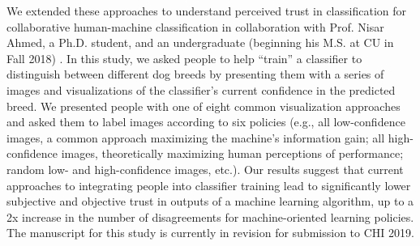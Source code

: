 \documentclass[11pt]{article}
\begin{document}
We extended these approaches to understand perceived trust in classification for collaborative human-machine classification in collaboration with Prof. Nisar Ahmed, a Ph.D. student, and an undergraduate (beginning his M.S. at CU in Fall 2018) \cite{iuzzolino2019In}. In this study, we asked people to help ``train'' a classifier to distinguish between different dog breeds by presenting them with a series of images and visualizations of the classifier's current confidence in the predicted breed. We presented people with one of eight common visualization approaches and asked them to label images according to six policies (e.g., all low-confidence images, a common approach maximizing the machine's information gain; all high-confidence images, theoretically maximizing human perceptions of performance; random low- and high-confidence images, etc.). Our results suggest that current approaches to integrating people into classifier training lead to significantly lower subjective and objective trust in outputs of a machine learning algorithm, up to a 2x increase in the number of disagreements for machine-oriented learning policies. The manuscript for this study is currently in revision for submission to CHI 2019. 


\end{document}
